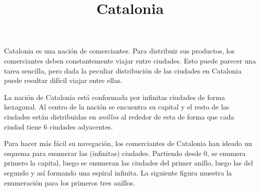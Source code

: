 \documentclass{oci}
\title{Catalonia}
\begin{document}
\begin{problemDescription}
Catalonia es una nación de comerciantes.
Para distribuir sus productos, los comerciantes deben constantemente
viajar entre ciudades.
Esto puede parecer una tarea sencilla, pero dada la peculiar distribución de las ciudades
en Catalonia puede resultar difícil viajar entre ellas.

La nación de Catalonia está conformada por infinitas ciudades de forma hexagonal.
Al centro de la nación se encuentra su capital y el resto de las ciudades están distribuidas
en \emph{anillos} al rededor de esta de forma que cada ciudad tiene 6 ciudades adyacentes.

Para hacer más fácil su navegación, los comerciantes de Catalonia han ideado un esquema
para enumerar las (infinitas) ciudades.
Partiendo desde 0, se enumera primero la capital, luego se enumeran las ciudades del primer anillo,
luego las del segundo y así formando una espiral infinita.
La siguiente figura muestra la enumeración para los primeros tres anillos.

\newdimen\R
\R=1cm
\newcommand{\hex}[3][]{
  \begin{scope}[rotate=90, xshift=#3*1.5*\R, yshift=#2*-0.866*\R]
  \draw[thick,#1] (0:\R) \foreach \x in {60, 120,...,359} {
    --(\x:\R)
  } -- cycle(90:\R);
  \end{scope}
}
\newcommand{\pos}[2]{
  #1*0.866*\R, #2*1.5*\R
}
\begin{center}
\end{center}
\end{problemDescription}
\end{document}
